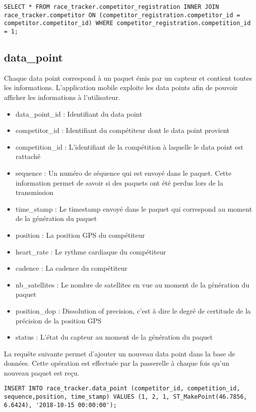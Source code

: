 \begin{lstlisting}[style=SQLStyle]
SELECT * FROM race_tracker.competitor_registration INNER JOIN race_tracker.competitor ON (competitor_registration.competitor_id = competitor.competitor_id) WHERE competitor_registration.competition_id = 1;
\end{lstlisting}

\subsection{data\_point}

Chaque data point correspond à un paquet émis par un capteur et contient toutes les informations. L'application mobile exploite les data points afin de pouvoir afficher les informations à l'utilisateur.

\begin{itemize}
\item data\_point\_id : Identifiant du data point
\item competitor\_id : Identifiant du compétiteur dont le data point provient
\item competition\_id : L'identifiant de la compétition à laquelle le data point est rattaché
\item sequence : Un numéro de séquence qui est envoyé dans le paquet. Cette information permet de savoir si des paquets ont été perdus lors de la transmission
\item time\_stamp : Le timestamp envoyé dans le paquet qui correspond au moment de la génération du paquet
\item position : La position GPS du compétiteur
\item heart\_rate : Le rythme cardiaque du compétiteur
\item cadence : La cadence du compétiteur
\item nb\_satellites : Le nombre de satellites en vue au moment de la génération du paquet
\item position\_dop : Dissolution of precision, c'est à dire le degré de certitude de la précision de la position GPS
\item status : L'état du capteur au moment de la génération du paquet
\end{itemize}

La requête suivante permet d'ajouter un nouveau data point dans la base de données. Cette opération est effectuée par la passerelle à chaque fois qu'un nouveau paquet est reçu.

\begin{lstlisting}[style=SQLStyle]
INSERT INTO race_tracker.data_point (competitor_id, competition_id, sequence,position, time_stamp) VALUES (1, 2, 1, ST_MakePoint(46.7856, 6.6424), '2018-10-15 00:00:00');
\end{lstlisting}

